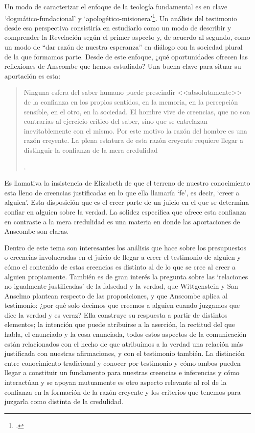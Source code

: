 Un modo de caracterizar el enfoque de la teología fundamental es en clave `dogmático-fundacional' y `apologético-misionera'\footnote{\Cite[Cf.][80-85]{ninot2009tf}.}. Un análisis del testimonio desde esa perspectiva consistiría en estudiarlo como un modo de describir y comprender la Revelación según el primer aspecto y, de acuerdo al segundo, como un modo de ``dar razón de nuestra esperanza'' en diálogo con la sociedad plural de la que formamos parte. Desde de este enfoque, ¿qué oportunidades ofrecen las reflexiones de Anscombe que hemos estudiado? Una buena clave para situar su aportación es esta: \blockquote[{\Cite[451]{prades2015testimonio}}.]{Ninguna esfera del saber humano puede prescindir <<absolutamente>> de la confianza en los propios sentidos, en la memoria, en la percepción sensible, en el otro, en la sociedad. El hombre vive de creencias, que no son contrarias al ejercicio crítico del saber, sino que se entrelazan inevitablemente con el mismo. Por este motivo la razón del hombre es una razón creyente. La plena estatura de esta razón creyente requiere llegar a distinguir la confianza de la mera credulidad}. Es llamativa la insistencia de Elizabeth de que el terreno de nuestro conocimiento esta lleno de creencias justificadas en lo que ella llamaría `fe', es decir, `creer a alguien'. Esta disposición que es el creer parte de un juicio en el que se determina confiar en alguien sobre la verdad. La solidez específica que ofrece esta confianza en contraste a la mera credulidad es una materia en donde las aportaciones de Anscombe son claras.

Dentro de este tema son interesantes los análisis que hace sobre los presupuestos o creencias involucradas en el juicio de llegar a creer el testimonio de alguien y cómo el contenido de estas creencias es distinto al de lo que se cree al creer a alguien propiamente. También es de gran interés la pregunta sobre las `relaciones no igualmente justificadas' de la falsedad y la verdad, que Wittgenstein y San Anselmo plantean respecto de las proposiciones, y que Anscombe aplica al testimonio: ¿por qué solo decimos que creemos a alguien cuando juzgamos que dice la verdad y es veraz? Ella construye su respuesta a partir de distintos elementos; la intención que puede atribuirse a la aserción, la rectitud del que habla, el enunciado y la cosa enunciada, todos estos aspectos de la comunicación están relacionados con el hecho de que atribuímos a la verdad una relación más justificada con nuestras afirmaciones, y con el testimonio también. La distinción entre conocimiento tradicional y conocer por testimonio y cómo ambos pueden llegar a constituir un fundamento para nuestras creencias e inferencias y cómo interactúan y se apoyan mutuamente es otro aspecto relevante al rol de la confianza en la formación de la razón creyente y los criterios que tenemos para juzgarla como distinta de la credulidad.

